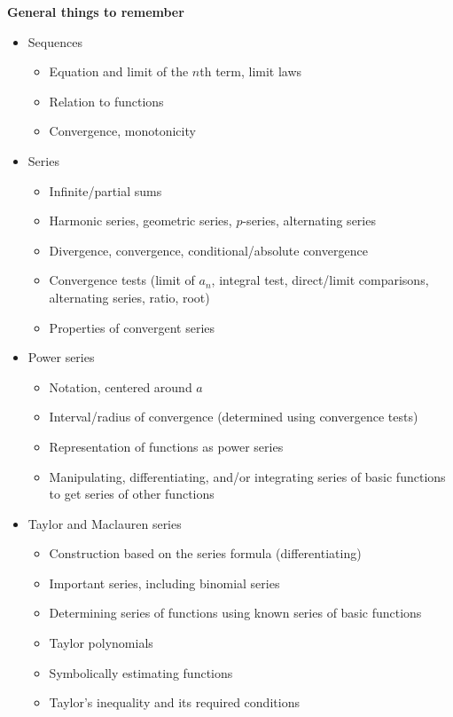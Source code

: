 \documentclass[11pt]{article}
\begin{document}
{\textbf{General things to remember}

\begin{itemize}
\item Sequences
\begin{itemize}
\item Equation and limit of the $n$th term, limit laws
\item Relation to functions
\item Convergence, monotonicity
\end{itemize}

\item Series
\begin{itemize}
\item Infinite/partial sums
\item Harmonic series, geometric series, $p$-series, alternating series
\item Divergence, convergence, conditional/absolute convergence
\item Convergence tests (limit of $a_n$, integral test, direct/limit comparisons, alternating series, ratio, root)
\item Properties of convergent series
\end{itemize}

\item Power series
\begin{itemize}
\item Notation, centered around $a$
\item Interval/radius of convergence (determined using convergence tests)
\item Representation of functions as power series
\item Manipulating, differentiating, and/or integrating series of basic functions to get series of other functions
\end{itemize}

\item Taylor and Maclauren series
\begin{itemize}
\item Construction based on the series formula (differentiating)
\item Important series, including binomial series
\item Determining series of functions using known series of basic functions
\item Taylor polynomials
\item Symbolically estimating functions
\item Taylor's inequality and its required conditions
\end{itemize}


\end{itemize}}
\end{document}
